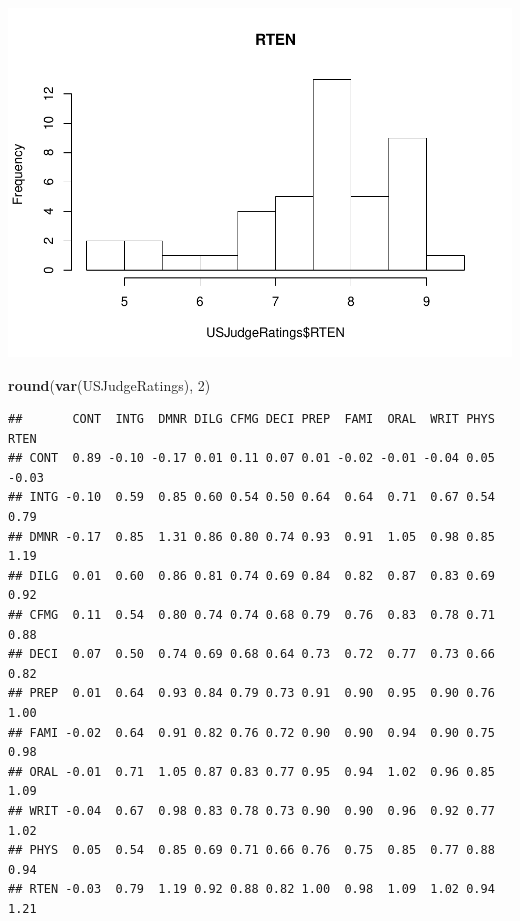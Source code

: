 \documentclass[]{article}
\newenvironment{Shaded}{\begin{snugshade}}{\end{snugshade}}
\newcommand{\DataTypeTok}[1]{\textcolor[rgb]{0.13,0.29,0.53}{#1}}
\newcommand{\DecValTok}[1]{\textcolor[rgb]{0.00,0.00,0.81}{#1}}
\newcommand{\KeywordTok}[1]{\textcolor[rgb]{0.13,0.29,0.53}{\textbf{#1}}}
\newcommand{\NormalTok}[1]{#1}
\newcommand{\OperatorTok}[1]{\textcolor[rgb]{0.81,0.36,0.00}{\textbf{#1}}}
\newcommand{\StringTok}[1]{\textcolor[rgb]{0.31,0.60,0.02}{#1}}
\begin{document}
\begin{Shaded}
\end{Shaded}

\includegraphics{Homework_Adrien_Toulouse_Paul-Antoine_Girard_files/figure-latex/unnamed-chunk-8-1.pdf}

\begin{Shaded}
\begin{Highlighting}[]
\KeywordTok{round}\NormalTok{(}\KeywordTok{var}\NormalTok{(USJudgeRatings), }\DecValTok{2}\NormalTok{)}
\end{Highlighting}
\end{Shaded}

\begin{verbatim}
##       CONT  INTG  DMNR DILG CFMG DECI PREP  FAMI  ORAL  WRIT PHYS  RTEN
## CONT  0.89 -0.10 -0.17 0.01 0.11 0.07 0.01 -0.02 -0.01 -0.04 0.05 -0.03
## INTG -0.10  0.59  0.85 0.60 0.54 0.50 0.64  0.64  0.71  0.67 0.54  0.79
## DMNR -0.17  0.85  1.31 0.86 0.80 0.74 0.93  0.91  1.05  0.98 0.85  1.19
## DILG  0.01  0.60  0.86 0.81 0.74 0.69 0.84  0.82  0.87  0.83 0.69  0.92
## CFMG  0.11  0.54  0.80 0.74 0.74 0.68 0.79  0.76  0.83  0.78 0.71  0.88
## DECI  0.07  0.50  0.74 0.69 0.68 0.64 0.73  0.72  0.77  0.73 0.66  0.82
## PREP  0.01  0.64  0.93 0.84 0.79 0.73 0.91  0.90  0.95  0.90 0.76  1.00
## FAMI -0.02  0.64  0.91 0.82 0.76 0.72 0.90  0.90  0.94  0.90 0.75  0.98
## ORAL -0.01  0.71  1.05 0.87 0.83 0.77 0.95  0.94  1.02  0.96 0.85  1.09
## WRIT -0.04  0.67  0.98 0.83 0.78 0.73 0.90  0.90  0.96  0.92 0.77  1.02
## PHYS  0.05  0.54  0.85 0.69 0.71 0.66 0.76  0.75  0.85  0.77 0.88  0.94
## RTEN -0.03  0.79  1.19 0.92 0.88 0.82 1.00  0.98  1.09  1.02 0.94  1.21
\end{verbatim}
\end{document}
